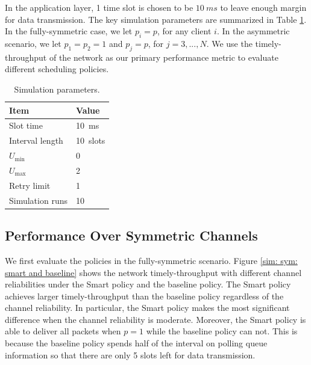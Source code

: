 \documentclass{article}
\begin{document}
In the application layer, 1 time slot is chosen to be $\SI{10}{ms}$ to leave enough margin for data transmission. The key simulation parameters are summarized in Table \ref{table: parameter}. In the fully-symmetric case, we let $p_i = p$, for any client $i$. In the asymmetric scenario, we let $p_1 = p_2 = 1$ and $p_j = p$, for $j = 3, ..., N$. We use the timely-throughput of the network as our primary performance metric to evaluate different scheduling policies.
\begin{table}[htbp]
\centering
    \caption{Simulation parameters.}
    \vspace{2mm}
    \begin{tabular}{ | l | l | }
    \hline
    Item & Value \\ \hline
    Slot time & \SI{10}{ms}  \\ \hline
    Interval length & \SI{10}{slots} \\ \hline
    $U_{\min}$ & 0 \\ \hline
    $U_{\max}$ & 2 \\ \hline
    Retry limit & 1 \\ \hline
    Simulation runs & 10 \\
    \hline
\end{tabular}
\label{table: parameter}
\end{table}


\subsection{Performance Over Symmetric Channels}
We first evaluate the policies in the fully-symmetric scenario. Figure \ref{sim: sym: smart and baseline} shows the network timely-throughput with different channel reliabilities under the Smart policy and the baseline policy. The Smart policy achieves larger timely-throughput than the baseline policy regardless of the channel reliability. In particular, the Smart policy makes the most significant difference when the channel reliability is moderate. Moreover, the Smart policy is able to deliver all packets when $p=1$ while the baseline policy can not. This is because the baseline policy spends half of the interval on polling queue information so that there are only 5 slots left for data transmission. 
\end{document}
